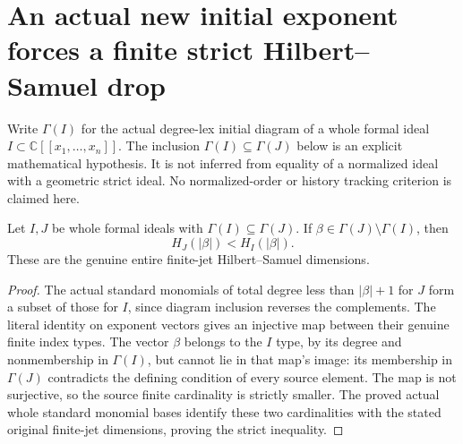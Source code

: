 \section{An actual new initial exponent forces a finite strict Hilbert--Samuel drop}

Write $\Gamma(I)$ for the actual degree-lex initial diagram of a whole
formal ideal $I\subset\mathbb C[[x_1,\ldots,x_n]]$. The inclusion
$\Gamma(I)\subseteq\Gamma(J)$ below is an explicit mathematical
hypothesis. It is not inferred from equality of a normalized ideal
with a geometric strict ideal. No normalized-order or history tracking
criterion is claimed here.

\begin{theorem}
\label{hir:actual-new-diagram-exponent-strict-hs-drop}
\leanok
Let $I,J$ be whole formal ideals with
$\Gamma(I)\subseteq\Gamma(J)$. If
$\beta\in\Gamma(J)\setminus\Gamma(I)$, then
\[
 H_J(|\beta|)<H_I(|\beta|).
\]
These are the genuine entire finite-jet Hilbert--Samuel dimensions.
\end{theorem}
\begin{proof}
The actual standard monomials of total degree less than
$|\beta|+1$ for $J$ form a subset of those for $I$, since diagram
inclusion reverses the complements. The literal identity on exponent
vectors gives an injective map between their genuine finite index types.
The vector $\beta$ belongs to the $I$ type, by its degree and
nonmembership in $\Gamma(I)$, but cannot lie in that map's image:
its membership in $\Gamma(J)$ contradicts the defining condition of
every source element. The map is not surjective, so the source finite
cardinality is strictly smaller. The proved actual whole standard
monomial bases identify these two cardinalities with the stated
original finite-jet dimensions, proving the strict inequality.
\end{proof}

